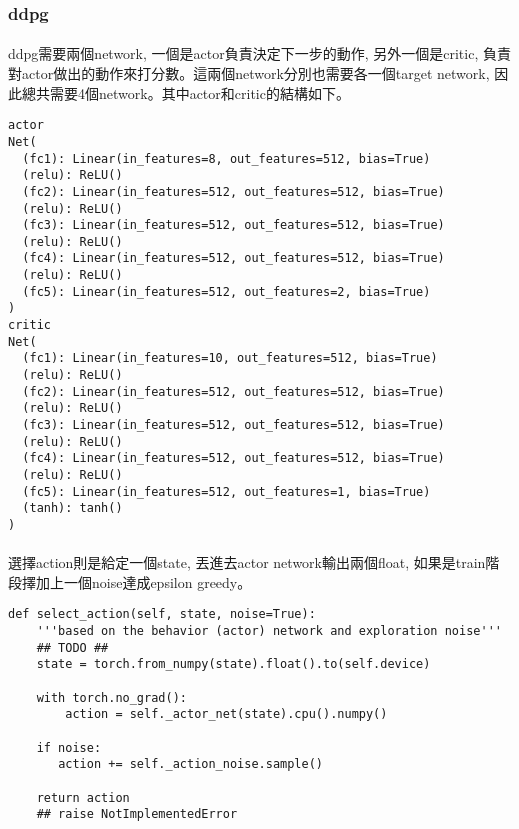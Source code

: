 \subsubsection{ddpg}
\paragraph{}
ddpg需要兩個network, 一個是actor負責決定下一步的動作, 另外一個是critic, 負責對actor做出的動作來打分數。這兩個network分別也需要各一個target network, 因此總共需要4個network。其中actor和critic的結構如下。
\begin{lstlisting}
actor
Net( 
  (fc1): Linear(in_features=8, out_features=512, bias=True)
  (relu): ReLU()
  (fc2): Linear(in_features=512, out_features=512, bias=True)
  (relu): ReLU()
  (fc3): Linear(in_features=512, out_features=512, bias=True) 
  (relu): ReLU()
  (fc4): Linear(in_features=512, out_features=512, bias=True)
  (relu): ReLU()
  (fc5): Linear(in_features=512, out_features=2, bias=True)
)
critic
Net( 
  (fc1): Linear(in_features=10, out_features=512, bias=True)
  (relu): ReLU()
  (fc2): Linear(in_features=512, out_features=512, bias=True)
  (relu): ReLU()
  (fc3): Linear(in_features=512, out_features=512, bias=True) 
  (relu): ReLU()
  (fc4): Linear(in_features=512, out_features=512, bias=True)
  (relu): ReLU()
  (fc5): Linear(in_features=512, out_features=1, bias=True)
  (tanh): tanh()
)
\end{lstlisting}
\paragraph{}
選擇action則是給定一個state, 丟進去actor network輸出兩個float, 如果是train階段擇加上一個noise達成epsilon greedy。
\begin{lstlisting}
def select_action(self, state, noise=True):
    '''based on the behavior (actor) network and exploration noise'''
    ## TODO ##
    state = torch.from_numpy(state).float().to(self.device)

    with torch.no_grad():
        action = self._actor_net(state).cpu().numpy()

    if noise:
       action += self._action_noise.sample()

    return action
    ## raise NotImplementedError
\end{lstlisting}
